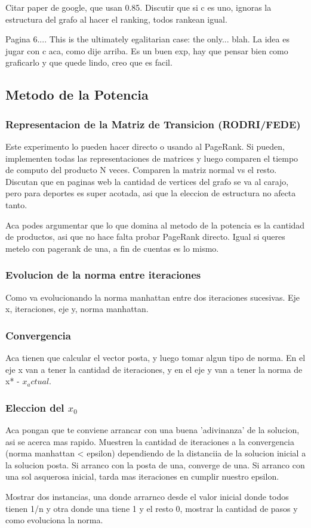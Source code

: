 Citar paper de google, que usan 0.85. Discutir que si c es uno, ignoras la estructura del grafo al hacer el ranking, todos rankean igual.

Pagina 6.... This is the ultimately egalitarian case: the only... blah. La idea es jugar con c aca, como dije arriba. Es un buen exp, hay que pensar bien como graficarlo y que quede lindo, creo que es facil.

\subsection{Metodo de la Potencia}

\subsubsection{Representacion de la Matriz de Transicion (RODRI/FEDE)}
Este experimento lo pueden hacer directo o usando al PageRank. Si pueden, implementen todas las representaciones de matrices y luego comparen el tiempo de computo del producto N veces. Comparen la matriz normal vs el resto. Discutan que en paginas web la cantidad de vertices del grafo se va al carajo, pero para deportes es super acotada, asi que la eleccion de estructura no afecta tanto.

Aca podes argumentar que lo que domina al metodo de la potencia es la cantidad de productos, asi que no hace falta probar PageRank directo. Igual si queres metelo con pagerank de una, a fin de cuentas es lo mismo.

\subsubsection{Evolucion de la norma entre iteraciones}
Como va evolucionando la norma manhattan entre dos iteraciones sucesivas. Eje x, iteraciones, eje y, norma manhattan.

\subsubsection{Convergencia}
Aca tienen que calcular el vector posta, y luego tomar algun tipo de norma. En el eje x van a tener la cantidad de iteraciones, y en el eje y van a tener la norma de x* - $x_actual$.

\subsubsection{Eleccion del $x_0$}

Aca pongan que te conviene arrancar con una buena 'adivinanza' de la solucion, asi se acerca mas rapido. Muestren la cantidad de iteraciones a la convergencia (norma manhattan < epsilon) dependiendo de la distanciia de la solucion inicial a la solucion posta. Si arranco con la posta de una, converge de una. Si arranco con una sol asquerosa inicial, tarda mas iteraciones en cumplir nuestro epsilon.

Mostrar dos instancias, una donde arrarnco desde el valor inicial donde todos tienen 1/n y otra donde una tiene 1 y el resto 0, mostrar la cantidad de pasos y como evoluciona la norma.


